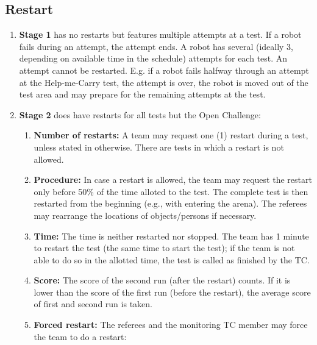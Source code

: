 \subsection{Restart}
\label{rule:restart}
\begin{enumerate}
	\item \textbf{Stage 1} has no restarts but features multiple attempts at a test. 
	If a robot fails during an attempt, the attempt ends. 
	A robot has several (ideally 3, depending on available time in the schedule) attempts for each test. An attempt cannot be restarted. 
	E.g. if a robot fails halfway through an attempt at the Help-me-Carry test, the attempt is over, the robot is moved out of the test area and may prepare for the remaining attempts at the test.

	\item \textbf{Stage 2} does have restarts for all tests but the Open Challenge:
	\begin{enumerate}
		\item \textbf{Number of restarts:} A team may request one (1) restart during a test, unless stated in otherwise. There are tests in which a restart is not allowed.
		\item \textbf{Procedure:} In case a restart is allowed, the team may request the restart only before 50\% of the time alloted to the test. The complete test is then restarted from the beginning (e.g., with entering the arena). The referees may rearrange the locations of objects/persons if necessary.
		\item \textbf{Time:} The time is neither restarted nor stopped. The team has 1 minute to restart the test (the same time to start the test); if the team is not able to do so in the allotted time, the test is called as finished by the TC.
		\item \textbf{Score:} The score of the second run (after the restart) counts. If it is lower than the score of the first run (before the restart), the average score of first and second run is taken.
		\item \textbf{Forced restart:} The referees and the monitoring TC member may force the team to do a restart:
	\end{enumerate}
\end{enumerate}

